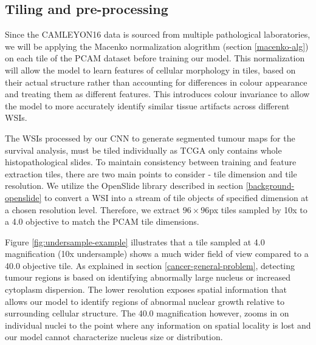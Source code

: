 \documentclass{l4proj}
\begin{document}
\subsection{Tiling and pre-processing} \label{tiling-design}
Since the CAMLEYON16 data is sourced from multiple pathological laboratories, we will be applying the Macenko normalization alogrithm (section \ref{macenko-alg}) on each tile of the PCAM dataset before training our model. This normalization will allow the model to learn features of cellular morphology in tiles, based on their actual structure rather than accounting for differences in colour appearance and treating them as different features. This introduces colour invariance to allow the model to more accurately identify similar tissue artifacts across different WSIs. 

The WSIs processed by our CNN to generate segmented tumour maps for the survival analysis, must be tiled individually as TCGA only contains whole histopathological slides. To maintain consistency between training and feature extraction tiles, there are two main points to consider - tile dimension and tile resolution. We utilize the OpenSlide library described in section \ref{background-openslide} to convert a WSI into a stream of tile objects of specified dimension at a chosen resolution level. Therefore, we extract \(96 \times 96\)px tiles sampled by 10x to a 4.0 objective to match the PCAM tile dimensions.

Figure \ref{fig:undersample-example} illustrates that a tile sampled at 4.0 magnification (10x undersample) shows a much wider field of view compared to a 40.0 objective tile. As explained in section \ref{cancer-general-problem}, detecting tumour regions is based on identifying abnormally large nucleus or increased cytoplasm dispersion. The lower resolution exposes spatial information that allows our model to identify regions of abnormal nuclear growth relative to surrounding cellular structure. The 40.0 magnification however, zooms in on individual nuclei to the point where any information on spatial locality is lost and our model cannot characterize nucleus size or distribution. 
\end{document}
